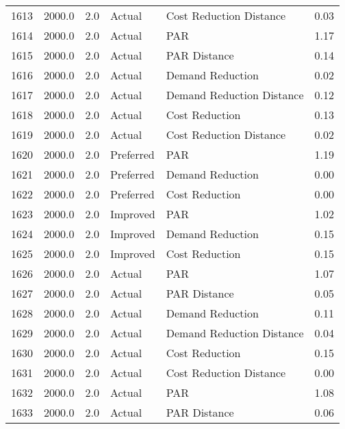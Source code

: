 \begin{longtable}{lrrllr}
1613 &       2000.0 &     2.0 &         Actual &    Cost Reduction Distance &   0.03 \\
1614 &       2000.0 &     2.0 &         Actual &                        PAR &   1.17 \\
1615 &       2000.0 &     2.0 &         Actual &               PAR Distance &   0.14 \\
1616 &       2000.0 &     2.0 &         Actual &           Demand Reduction &   0.02 \\
1617 &       2000.0 &     2.0 &         Actual &  Demand Reduction Distance &   0.12 \\
1618 &       2000.0 &     2.0 &         Actual &             Cost Reduction &   0.13 \\
1619 &       2000.0 &     2.0 &         Actual &    Cost Reduction Distance &   0.02 \\
1620 &       2000.0 &     2.0 &      Preferred &                        PAR &   1.19 \\
1621 &       2000.0 &     2.0 &      Preferred &           Demand Reduction &   0.00 \\
1622 &       2000.0 &     2.0 &      Preferred &             Cost Reduction &   0.00 \\
1623 &       2000.0 &     2.0 &       Improved &                        PAR &   1.02 \\
1624 &       2000.0 &     2.0 &       Improved &           Demand Reduction &   0.15 \\
1625 &       2000.0 &     2.0 &       Improved &             Cost Reduction &   0.15 \\
1626 &       2000.0 &     2.0 &         Actual &                        PAR &   1.07 \\
1627 &       2000.0 &     2.0 &         Actual &               PAR Distance &   0.05 \\
1628 &       2000.0 &     2.0 &         Actual &           Demand Reduction &   0.11 \\
1629 &       2000.0 &     2.0 &         Actual &  Demand Reduction Distance &   0.04 \\
1630 &       2000.0 &     2.0 &         Actual &             Cost Reduction &   0.15 \\
1631 &       2000.0 &     2.0 &         Actual &    Cost Reduction Distance &   0.00 \\
1632 &       2000.0 &     2.0 &         Actual &                        PAR &   1.08 \\
1633 &       2000.0 &     2.0 &         Actual &               PAR Distance &   0.06 \\

\end{longtable}
